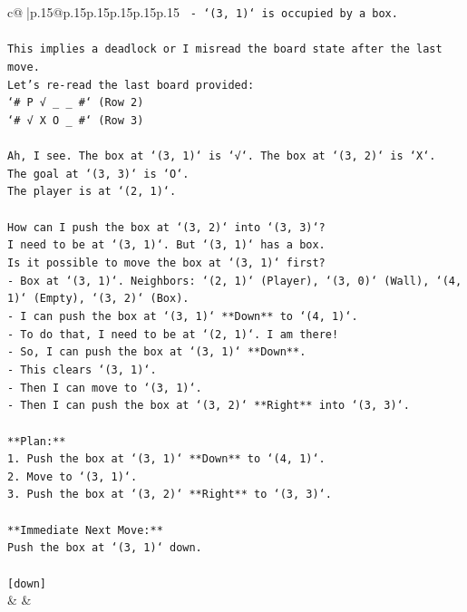 \documentclass{article}
\begin{document}
{\begin{supertabular}{c@{$\;$}|p{.15\linewidth}@{}p{.15\linewidth}p{.15\linewidth}p{.15\linewidth}p{.15\linewidth}p{.15\linewidth}}
{{{\texttt{    {-} `(3, 1)` is occupied by a box.} \\
\\ 
\texttt{This implies a deadlock or I misread the board state after the last move.} \\
\texttt{Let's re{-}read the last board provided:} \\
\texttt{`\# P √ \_ \_ \#` (Row 2)} \\
\texttt{`\# √ X O \_ \#` (Row 3)} \\
\\ 
\texttt{Ah, I see. The box at `(3, 1)` is `√`. The box at `(3, 2)` is `X`.} \\
\texttt{The goal at `(3, 3)` is `O`.} \\
\texttt{The player is at `(2, 1)`.} \\
\\ 
\texttt{How can I push the box at `(3, 2)` into `(3, 3)`?} \\
\texttt{I need to be at `(3, 1)`. But `(3, 1)` has a box.} \\
\texttt{Is it possible to move the box at `(3, 1)` first?} \\
\texttt{{-} Box at `(3, 1)`. Neighbors: `(2, 1)` (Player), `(3, 0)` (Wall), `(4, 1)` (Empty), `(3, 2)` (Box).} \\
\texttt{{-} I can push the box at `(3, 1)` **Down** to `(4, 1)`.} \\
\texttt{{-} To do that, I need to be at `(2, 1)`. I am there!} \\
\texttt{{-} So, I can push the box at `(3, 1)` **Down**.} \\
\texttt{{-} This clears `(3, 1)`.} \\
\texttt{{-} Then I can move to `(3, 1)`.} \\
\texttt{{-} Then I can push the box at `(3, 2)` **Right** into `(3, 3)`.} \\
\\ 
\texttt{**Plan:**} \\
\texttt{1.  Push the box at `(3, 1)` **Down** to `(4, 1)`.} \\
\texttt{2.  Move to `(3, 1)`.} \\
\texttt{3.  Push the box at `(3, 2)` **Right** to `(3, 3)`.} \\
\\ 
\texttt{**Immediate Next Move:**} \\
\texttt{Push the box at `(3, 1)` down.} \\
\\ 
\texttt{{[}down{]}} \\
            }
        }
    }
    & & \\ \\


\end{supertabular}}
\end{document}
